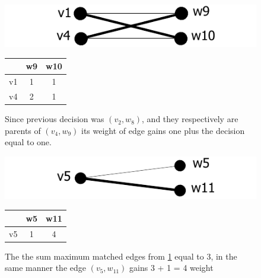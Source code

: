 \documentclass{report}
\begin{document}
\begin{figure}[h]
  \begin{minipage}[h]{0.60\linewidth}
    \centering
    \includegraphics[scale=0.95]{Figures/algorithms/TD/5ex.pdf}\\[0.1cm]
    
  \end{minipage}%
  \begin{minipage}[b]{0.30\linewidth}
    \centering
\begin{tabular}{|c|c|c|}
\hline
   & w9 & w10 \\ \hline
v1 & 1  & \cellcolor[gray]{0.9} 1   \\ \hline
v4 &  \cellcolor[gray]{0.9}2  & 1   \\ \hline
\end{tabular}
\end{minipage}
\caption[]{Since previous decision was $(v_{2},w_{8})$, and they respectively are parents of $(v_{4},w_{9})$ its weight of edge gains one plus the decision equal to one.}
\label{fig:ex5}
\end{figure}

\begin{figure}[h]
  \begin{minipage}[h]{0.60\linewidth}
    \centering
    \includegraphics[scale=0.95]{Figures/algorithms/TD/4ex.pdf}\\[0.1cm]
    
  \end{minipage}%
  \begin{minipage}[b]{0.30\linewidth}
    \centering
\begin{tabular}{|c|c|c|}
\hline
   & w5 & w11 \\ \hline
v5 & 1  &  \cellcolor[gray]{0.9} 4   \\ \hline
\end{tabular}
\end{minipage}
\caption[]{The the sum maximum matched edges from \ref{fig:ex5} equal to 3, in the same manner the edge $(v_{5},w_{11})$ gains 3 + 1 = 4 weight}
\label{fig:ex4}
\end{figure}
\end{document}
